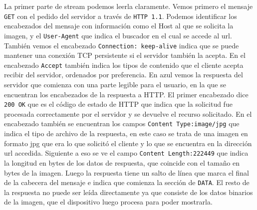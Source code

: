 \documentclass[12pt]{article} %
\begin{document}
La primer parte de stream podemos leerla claramente. Vemos primero el mensaje \texttt{GET} con el pedido del servidor a través de \texttt{HTTP 1.1}. Podemos identificar los encabezados del mensaje con información como el Host al que se solicita la imagen, y el \texttt{User-Agent} que indica el buscador en el cual se accede al url. También vemos el encabezado \texttt{Connection: keep-alive} indica que se puede mantener una conexión TCP persistente si el servidor también la acepta. En el encabezado \texttt{Accept} también indica los tipos de contenido que el cliente acepta recibir del servidor, ordenados por preferencia.
\newline
\newline
En azul vemos la respuesta del servidor que comienza con una parte legible para el usuario, en la que se encuentran los encabezados de la respuesta a HTTP. El primer encabezado dice \texttt{200 OK} que es el código de estado de HTTP que indica que la solicitud fue procesada correctamente por el servidor y se devuelve el recurso solicitado.
\newline
\newline
En el encabezado también se encuentran los campos \texttt{Content Type:image/jpg} que indica el tipo de archivo de la respuesta, en este caso se trata de una imagen en formato jpg que era lo que solicitó el cliente y lo que se encuentra en la dirección url accedida. Siguiente a eso se ve el campo \texttt{Content Length:222449} que indica la longitud en bytes de los datos de respuesta, que coincide con el tamaño en bytes de la imagen. 
\newline
\newline
Luego la respuesta tiene un salto de línea que marca el final de la cabecera del mensaje e indica que comienza la sección de \texttt{DATA}. El resto de la respuesta no puede ser leída directamente ya que consiste de los datos binarios de la imagen, que el dispositivo luego procesa para poder mostrarla.

\end{document}

